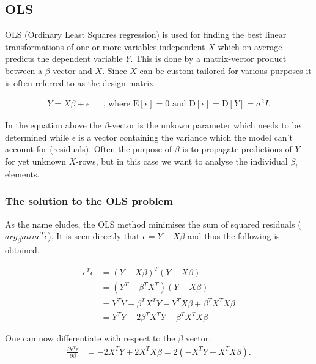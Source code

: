 \subsection{OLS}
OLS (Ordinary Least Squares regression) is used for finding the best linear transformations of one or more variables independent $X$ which on average predicts the dependent variable $Y$.
This is done by a matrix-vector product between a $\beta$ vector and $X$.
Since $X$ can be custom tailored for various purposes it is often referred to as the design matrix.

\begin{align}
Y=X \beta +\epsilon && \text{, where } \mathrm{E}[\epsilon] = 0 \text{ and } \mathrm{D}[\epsilon] = \mathrm{D}[Y] = \sigma^2 I .
\end{align}

In the equation above the $\beta$-vector is the unkown parameter which needs to be determined while  $\epsilon$ is a vector containing the variance which the model can't account for (residuals).
Often the purpose of $\beta$ is to propagate predictions of $Y$ for yet unknown $X$-rows, but in this case we want to analyse the individual $\beta_i$ elements.

\subsubsection{The solution to the OLS problem}
As the name eludes, the OLS method minimises the sum of squared residuals ($arg_\beta min \epsilon^T \epsilon$).
It is seen directly that $\epsilon = Y - X \beta$ and thus the following is obtained.

\begin{equation}
\begin{split}
\epsilon^T\epsilon&=(Y-X\beta)^T (Y-X\beta)\\
&=(Y^T-\beta^T X^T) (Y-X\beta) \\
&=Y^T Y-\beta^T X^T Y-Y^T X \beta + \beta^T X^T X \beta \\
&=Y^T Y- 2\beta^T X^T Y+ \beta^T X^T X \beta
\end{split}
\end{equation}

One can now differentiate with respect to the $\beta$ vector.
\begin{equation}
\begin{split}
\frac{\partial \epsilon^T\epsilon}{\partial \beta}&=-2 X^T Y+2X^T X \beta=2(-X^T Y+X^T X \beta).
\end{split}
\end{equation}

